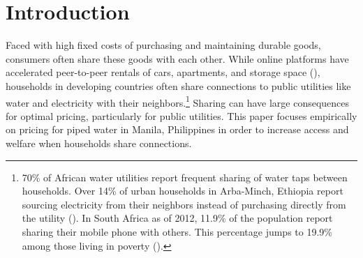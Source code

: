 \documentclass[12pt]{article}
\begin{document}
\section{Introduction}







Faced with high fixed costs of purchasing and maintaining durable goods, consumers often share these goods with each other.  While online platforms have accelerated peer-to-peer rentals of cars, apartments, and storage space (\cite{horton2016owning}), households in developing countries often share connections to public utilities like water and electricity with their neighbors.\footnote{70\% of African water utilities report frequent sharing of water taps between households.  Over 14\% of urban households in Arba-Minch, Ethiopia report sourcing electricity from their neighbors instead of purchasing directly from the utility (\cite{mustefa2016energy}).  In South Africa as of 2012, 11.9\% of the population report sharing their mobile phone with others.  This percentage jumps to 19.9\% among those living in poverty (\cite{calandro2012mobile}).}  Sharing can have large consequences for optimal pricing, particularly for public utilities.  This paper focuses empirically on pricing for piped water in Manila, Philippines in order to increase access and welfare when households share connections.  
\end{document}
